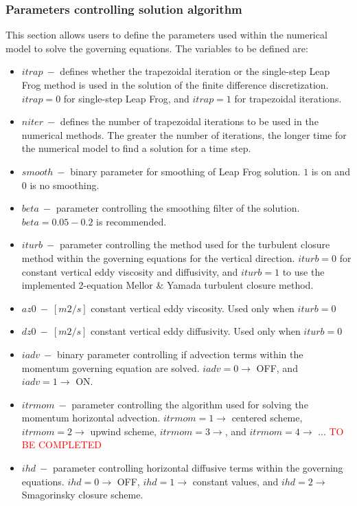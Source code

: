 \subsubsection{Parameters controlling solution algorithm}
This section allows users to define the parameters used within the numerical model to solve the governing equations. The variables to be defined are: 

\begin{itemize}
    \item $itrap\ -$ defines whether the trapezoidal iteration or the single-step Leap Frog method is used in the solution of the finite difference discretization. $itrap = 0$ for single-step Leap Frog, and $itrap = 1$ for trapezoidal iterations.
    \item $niter\ -$ defines the number of trapezoidal iterations to be used in the numerical methods. The greater the number of iterations, the longer time for the numerical model to find a solution for a time step. 
    \item $smooth\ -$ binary parameter for smoothing of Leap Frog solution. $1$ is on and $0$ is no smoothing.
    \item $beta\ -$ parameter controlling the smoothing filter of the solution. $beta = 0.05-0.2$ is recommended.
    \item $iturb\ -$ parameter controlling the method used for the turbulent closure method within the governing equations for the vertical direction. $iturb = 0$ for constant vertical eddy viscosity and diffusivity, and $iturb = 1$ to use the implemented 2-equation Mellor \& Yamada turbulent closure method.
    \item $az0\ -\ [m2/s]$ constant vertical eddy viscosity. Used only when $iturb = 0$
    \item $dz0\ -\ [m2/s]$ constant vertical eddy diffusivity. Used only when $iturb = 0$
    \item $iadv\ -$ binary parameter controlling if advection terms within the momentum governing equation are solved. $iadv = 0 \rightarrow$ OFF, and $iadv = 1 \rightarrow$ ON.
    \item $itrmom\ -$ parameter controlling the algorithm used for solving the momentum horizontal advection. $itrmom = 1 \rightarrow$ centered scheme, $itrmom = 2 \rightarrow$ upwind scheme, $itrmom = 3 \rightarrow $, and $itrmom = 4 \rightarrow $ ... \textcolor{red}{TO BE COMPLETED}
    \item $ihd\ -$ parameter controlling horizontal diffusive terms within the governing equations. $ihd = 0 \rightarrow$ OFF, $ihd = 1 \rightarrow$ constant values, and $ihd = 2 \rightarrow $ Smagorinsky closure scheme.

\end{itemize}
